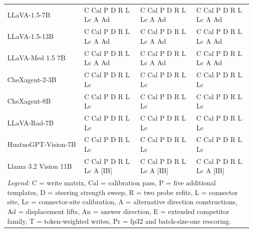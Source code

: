 \begin{table}[htbp]
{\begin{tabular}{llll}
LLaVA-1.5-7B & C Cal P D R L Lc A Ad & C Cal P D R L Lc A Ad & C Cal P D R L Lc A Ad \\
LLaVA-1.5-13B & C Cal P D R L Lc A Ad & C Cal P D R L Lc A Ad & C Cal P D R L Lc A Ad \\
LLaVA-Med 1.5 7B & C Cal P D R L Lc A Ad & C Cal P D R L Lc A Ad & C Cal P D R L Lc A Ad \\
CheXagent-2-3B & C Cal P D R L Lc & C Cal P D R L Lc & C Cal P D R L Lc \\
CheXagent-8B & C Cal P D R L Lc & C Cal P D R L Lc & C Cal P D R L Lc \\
LLaVA-Rad-7B & C Cal P D R L Lc & C Cal P D R L Lc & C Cal P D R L Lc \\
HuatuoGPT-Vision-7B & C Cal P D R L Lc & C Cal P D R L Lc & C Cal P D R L Lc \\
Llama 3.2 Vision 11B & C Cal P D R L Lc A [IB] & C Cal P D R L Lc A [IB] & C Cal P D R L Lc A [IB] \\
\midrule
\multicolumn{4}{p{1.357\textwidth}}{\textit{Legend:} C = write matrix, Cal = calibration pass, P = five additional templates, D = steering strength sweep, R = two probe refits, L = connector site, Lc = connector-site calibration, A = alternative direction constructions, Ad = displacement lifts, An = answer direction, E = extended competitor family, T = token-weighted writes, Pr = fp32 and batch-size-one rescoring.} \\
\bottomrule
\end{tabular}}
\end{table}
